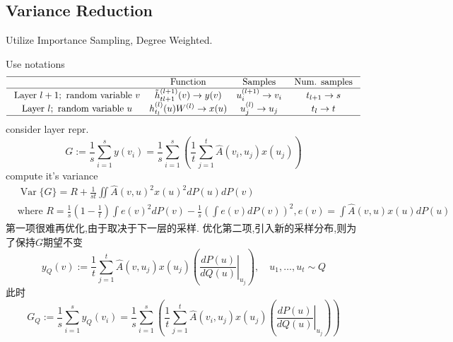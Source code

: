 \documentclass{article}
\begin{document}
\subsection{Variance Reduction}

     Utilize Importance Sampling, Degree Weighted.

    Use notations
    \begin{equation}
        \begin{array}{cccc}
        \hline & \text { Function } & \text { Samples } & \text { Num. samples } \\
        \hline \text { Layer } l+1 ; \text { random variable } v & \tilde{h}_{t l+1}^{(l+1)}(v) \rightarrow y(v) & u_{i}^{(l+1)} \rightarrow v_{i} & t_{l+1} \rightarrow s \\
        \text { Layer } l ; \text { random variable } u & h_{t_{l}}^{(l)}(u) W^{(l)} \rightarrow x(u) & u_{j}^{(l)} \rightarrow u_{j} & t_{l} \rightarrow t \\
        \hline
        \end{array}
    \end{equation}
    consider layer repr. 
    \begin{equation}
        G:=\frac{1}{s} \sum_{i=1}^{s} y\left(v_{i}\right)=\frac{1}{s} \sum_{i=1}^{s}\left(\frac{1}{t} \sum_{j=1}^{t} \hat{A}\left(v_{i}, u_{j}\right) x\left(u_{j}\right)\right)
    \end{equation}
    compute it's variance
    \begin{align}
        &\operatorname{Var}\{G\}=R+\frac{1}{s t} \iint \hat{A}(v, u)^{2} x(u)^{2} d P(u) d P(v)\\
        &\text{where } R=\frac{1}{s}\left(1-\frac{1}{t}\right) \int e(v)^{2} d P(v)-\frac{1}{s}\left(\int e(v) d P(v)\right)^{2}, e(v)=\int \hat{A}(v, u) x(u) d P(u)
    \end{align}
    第一项很难再优化,由于取决于下一层的采样. 优化第二项,引入新的采样分布,则为了保持$G$期望不变
    \begin{equation}
        y_{Q}(v):=\frac{1}{t} \sum_{j=1}^{t} \hat{A}\left(v, u_{j}\right) x\left(u_{j}\right)\left(\left.\frac{d P(u)}{d Q(u)}\right|_{u_{j}}\right), \quad u_{1}, \ldots, u_{t} \sim Q
    \end{equation}
    此时
    \begin{equation}
        G_{Q}:=\frac{1}{s} \sum_{i=1}^{s} y_{Q}\left(v_{i}\right)=\frac{1}{s} \sum_{i=1}^{s}\left(\frac{1}{t} \sum_{j=1}^{t} \hat{A}\left(v_{i}, u_{j}\right) x\left(u_{j}\right)\left(\left.\frac{d P(u)}{d Q(u)}\right|_{u_{j}}\right)\right)
    \end{equation}
\end{document}
